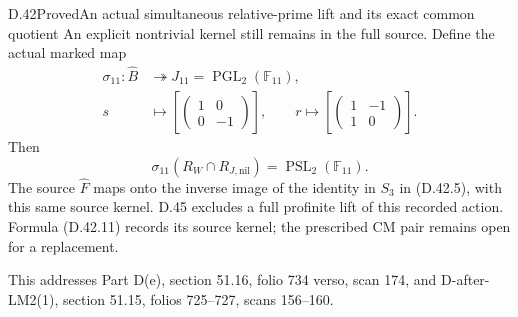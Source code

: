 \begin{statement}{D.42}{Proved}{An actual simultaneous relative-prime lift and its exact common quotient}
An explicit nontrivial kernel still remains in the
full source. Define the actual marked map
\[
 \begin{split}
 \sigma_{11}:\widehat B&\twoheadrightarrow
                 J_{11}=\operatorname{PGL}_2(\mathbb F_{11}),\\
 s&\longmapsto
       \left[\begin{pmatrix}1&0\\0&-1\end{pmatrix}\right],
 \qquad
 r\longmapsto
       \left[\begin{pmatrix}1&-1\\1&0\end{pmatrix}\right].
 \end{split}                                          \tag{D.42.10}
\]
Then
\[
 \sigma_{11}(R_W\cap R_{J,\mathrm{nil}})
       =\operatorname{PSL}_2(\mathbb F_{11}).           \tag{D.42.11}
\]
The source $\widehat F$ maps onto the inverse image
of the identity in $S_3$ in (D.42.5), with this same
source kernel. D.45 excludes a full profinite lift of this
recorded action. Formula (D.42.11) records its source
kernel; the prescribed CM pair remains open for a replacement.

This addresses Part D(e), section 51.16, folio
734 verso, scan 174, and D-after-LM2(1), section
51.15, folios 725--727, scans 156--160.
\end{statement}

